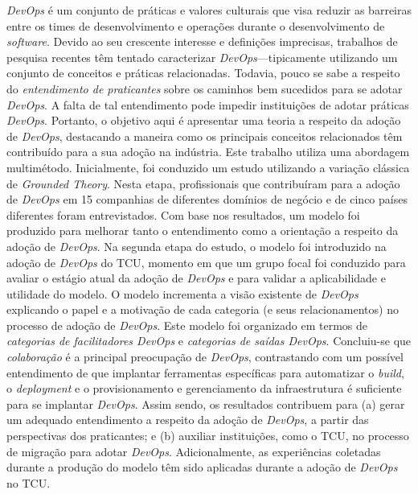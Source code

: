 {\it DevOps} é um conjunto de práticas e valores culturais que visa reduzir as
barreiras entre os times de desenvolvimento e operações durante o
desenvolvimento de {\it software}. Devido ao seu crescente interesse e
definições imprecisas, trabalhos de pesquisa recentes têm tentado caracterizar
{\it DevOps}---tipicamente utilizando um conjunto de conceitos e práticas
relacionadas. Todavia, pouco se sabe a respeito do \emph{entendimento de
praticantes} sobre os caminhos bem sucedidos para se adotar {\it DevOps}. A falta
de tal entendimento pode impedir instituições de adotar práticas {\it DevOps}.
Portanto, o objetivo aqui é apresentar uma teoria a respeito da adoção de
{\it DevOps}, destacando a maneira como os principais conceitos relacionados
têm contribuído para a sua adoção na indústria. Este trabalho utiliza uma
abordagem multimétodo. Inicialmente, foi conduzido um estudo utilizando a
variação clássica de {\it Grounded Theory}. Nesta etapa, profissionais que
contribuíram para a adoção de {\it DevOps} em 15 companhias de diferentes
domínios de negócio e de cinco países diferentes foram entrevistados. Com base
nos resultados, um modelo foi produzido para melhorar tanto o entendimento
como a orientação a respeito da adoção de {\it DevOps}. Na segunda etapa do
estudo, o modelo foi introduzido na adoção de {\it DevOps} do \acrfull{TCU},
momento em que um grupo focal foi conduzido para avaliar o estágio atual da
adoção de {\it DevOps} e para validar a aplicabilidade e utilidade do modelo.
O modelo incrementa a visão existente de {\it DevOps} explicando o papel e a
motivação de cada categoria (e seus relacionamentos) no processo de adoção de {\it DevOps}.
Este modelo foi organizado em termos de \emph{categorias de facilitadores DevOps}
e \emph{categorias de saídas DevOps}. Concluiu-se que \emph{colaboração} é a
principal preocupação de {\it DevOps}, contrastando com um possível
entendimento de que implantar ferramentas específicas para automatizar o
{\it build}, o {\it deployment} e o provisionamento e gerenciamento da
infraestrutura é suficiente para se implantar {\it DevOps}.
Assim sendo, os resultados contribuem para (a) gerar um adequado entendimento a
respeito da adoção de {\it DevOps}, a partir das perspectivas dos praticantes;
e (b) auxiliar instituições, como o \acrshort{TCU}, no processo de migração
para adotar {\it DevOps}. Adicionalmente, as experiências coletadas durante a
produção do modelo têm sido aplicadas durante a adoção de {\it DevOps} no
\acrshort{TCU}.
